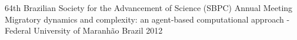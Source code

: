 






\begin{cvhonors}

  \cvhonor
    {64th Brazilian Society for the Advancement of Science (SBPC) Annual Meeting} %
    {Migratory dynamics and complexity: an agent-based computational approach - Federal University of Maranhão} %
    {Brazil} %
    {2012} %
\end{cvhonors}